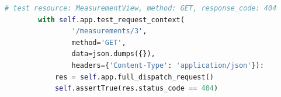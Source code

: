 \begin{itemize}
\begin{lstlisting}[language=Python]
        # test resource: MeasurementView, method: GET, response_code: 404
        with self.app.test_request_context(
                '/measurements/3',
                method='GET',
                data=json.dumps({}),
                headers={'Content-Type': 'application/json'}):
            res = self.app.full_dispatch_request()
            self.assertTrue(res.status_code == 404)
\end{lstlisting}


\end{itemize}